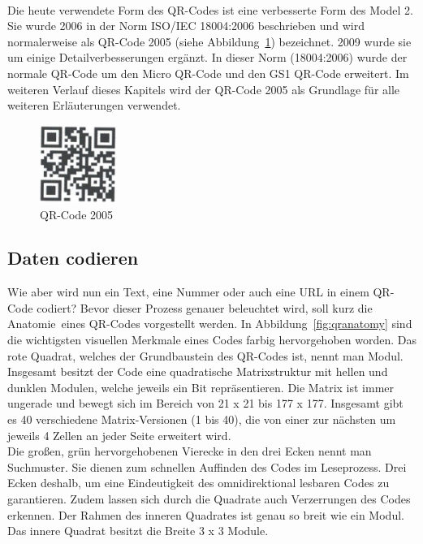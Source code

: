 ~\\
Die heute verwendete Form des QR-Codes ist eine verbesserte Form des Model 2. 
Sie wurde 2006 in der Norm ISO/IEC 18004:2006 beschrieben und wird normalerweise als QR-Code 2005 (siehe Abbildung~\ref{fig:qr2005}) bezeichnet. 
2009 wurde sie um einige Detailverbesserungen ergänzt. 
In dieser Norm (18004:2006) wurde der normale QR-Code um den Micro QR-Code und den GS1 QR-Code erweitert. \pagebreak
Im weiteren Verlauf dieses Kapitels wird der QR-Code 2005 als Grundlage für alle weiteren Erläuterungen verwendet.

\begin{figure}[htbp]
	\centering
	\includegraphics[width=2.5cm]{Bilder/QR_Code_2005.png}
	\caption[QR-Code 2005]{QR-Code 2005\footnotemark}
	\label{fig:qr2005}
	\hfill
\end{figure}

\subsection{Daten codieren}
Wie aber wird nun ein Text, eine Nummer oder auch eine URL in einem QR-Code codiert? Bevor dieser Prozess genauer beleuchtet wird, soll kurz die \glqq Anatomie\grqq~eines QR-Codes vorgestellt werden. In Abbildung~\ref{fig:qranatomy} sind die wichtigsten visuellen Merkmale eines Codes farbig hervorgehoben worden. Das rote Quadrat, welches der Grundbaustein des QR-Codes ist, nennt man Modul. Insgesamt besitzt der Code eine quadratische Matrixstruktur mit hellen und dunklen Modulen, welche jeweils ein Bit repräsentieren. Die Matrix ist immer ungerade und bewegt sich im Bereich von 21 x 21 bis 177 x 177. Insgesamt gibt es 40 verschiedene Matrix-Versionen (1 bis 40), die von einer zur nächsten um jeweils 4 Zellen an jeder Seite erweitert wird.\\
Die großen, grün hervorgehobenen Vierecke in den drei Ecken nennt man Suchmuster. Sie dienen zum schnellen Auffinden des Codes im Leseprozess. Drei Ecken deshalb, um eine Eindeutigkeit des omnidirektional lesbaren Codes zu garantieren. Zudem lassen sich durch die Quadrate auch Verzerrungen des Codes erkennen. Der Rahmen des inneren Quadrates ist genau so breit wie ein Modul. Das innere Quadrat besitzt die Breite 3 x 3 Module. 

